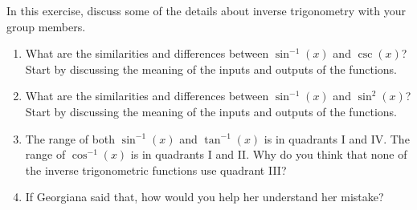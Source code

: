

\begin{myPractice}
In this exercise, discuss some of the details about inverse trigonometry with your group members.
	\begin{enumerate}
		\item What are the similarities and differences between $\sin^{-1}(x)$ and $\csc(x)$? Start by discussing the meaning of the inputs and outputs of the functions.
		\vfill
		\item What are the similarities and differences between $\sin^{-1}(x)$ and $\sin^2(x)$? Start by discussing the meaning of the inputs and outputs of the functions.
		\vfill
		\item The range of both $\sin^{-1}(x)$ and $\tan^{-1}(x)$ is in quadrants I and IV. The range of $\cos^{-1}(x)$ is in quadrants I and II. Why do you think that none of the inverse trigonometric functions use quadrant III?
		\vfill
		\item If Georgiana said that,  how would you help her understand her mistake?
		\vfill
	\end{enumerate}
\end{myPractice}

